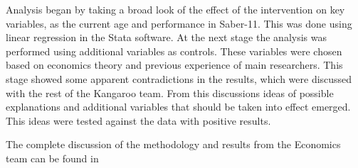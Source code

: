 Analysis began by taking a broad look of the effect of the intervention on key variables, as the current age and performance in Saber-11. This was done using linear regression in the Stata software. At the next stage the analysis was performed using additional variables as controls. These variables were chosen based on economics theory and previous experience of main researchers. This stage showed some apparent contradictions in the results, which were discussed with the rest of the Kangaroo team. From this discussions ideas of possible explanations and additional variables that should be taken into effect emerged. This ideas were tested against the data with positive results. 

The complete discussion of the methodology and results from the Economics team can be found in \autocite{?}



